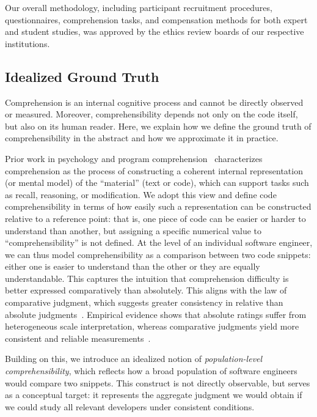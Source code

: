 Our overall methodology, including participant recruitment procedures,
questionnaires, comprehension tasks, and compensation methods for both
expert and student studies, was approved by the ethics review boards
of our respective institutions.

\subsection{Idealized Ground Truth}
\label{sec:ground-truth}

Comprehension is an internal cognitive
process and cannot be directly observed or measured. Moreover, comprehensibility
depends not only on the code itself, but also on its
human reader.
Here, we explain how we define the ground truth of comprehensibility in the abstract
and how we approximate it in practice.

Prior work in psychology and program
comprehension~\cite{penningtonModel,f1,f2,f3,f4} characterizes
comprehension as the process of constructing a coherent internal
representation (or mental model) of the ``material'' (\eg text or
code), which can support tasks such as recall, reasoning, or
modification. We adopt this view and define code comprehensibility in
terms of how easily such a representation can be constructed relative
to a reference point: that is, one piece of code can be
easier or harder to understand than another, but assigning
a specific numerical value to “comprehensibility” is not defined.
At the level of an individual software engineer, we can thus model comprehensibility as a comparison between two code snippets: either one
is easier to understand than the other or
they are equally understandable. This captures the intuition that comprehension difficulty is better expressed comparatively than absolutely. This aligns with the law of comparative judgment, which suggests greater consistency in relative than absolute judgments~\cite{Thurstone:LCJ2017}. Empirical evidence shows that absolute ratings suffer from heterogeneous scale interpretation, whereas comparative judgments yield more consistent and reliable measurements~\cite{Kinnear:BRM2025}.

Building on this, we introduce an idealized notion of
\textit{population-level comprehensibility}, which reflects how a
broad population of software engineers would compare two
snippets. This construct is not directly observable, but serves as a
conceptual target: it represents the aggregate judgment we would
obtain if we could study all relevant developers under consistent
conditions.

